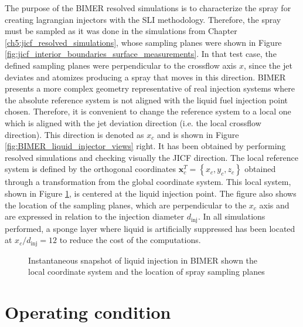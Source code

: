 The purpose of the BIMER resolved simulations is to characterize the spray for creating lagrangian injectors with the SLI methodology. Therefore, the spray must be sampled as it was done in the simulations from Chapter \ref{ch5:jicf_resolved_simulations}, whose sampling planes were shown in Figure \ref{fig:jicf_interior_boundaries_surface_measurements}. In that test case, the defined sampling planes were perpendicular to the crossflow axis $x$, since the jet deviates and atomizes producing a spray that moves in this direction. BIMER presents a more complex geometry representative of real injection systems where the absolute reference system is not aligned with the liquid fuel injection point chosen. Therefore, it is convenient to change the reference system to a local one which is aligned with the jet deviation direction (i.e. the local crossflow direction). This direction is denoted as $x_c$ and is shown in Figure \ref{fig:BIMER_liquid_injector_views} right. It has been obtained by performing resolved simulations and checking visually the JICF direction. The local reference system is defined by the orthogonal coordinates $\textbf{x}_c^T =\left\lbrace x_c, y_c, z_c \right\rbrace$ obtained through a transformation from the global coordinate system. This local system, shown in Figure \ref{fig:BIMER_local_FoR_and_sampling_planes}, is centered at the liquid injection point. The figure also shows the location of the sampling planes, which are perpendicular to the $x_c$ axis and are expressed in relation to the injection diameter $d_\mathrm{inj}$. In all simulations performed, a sponge layer where liquid is artificially suppressed has been located at $x_c/d_\mathrm{inj} = 12$ to reduce the cost of the computations.

\begin{figure}[h!]
	\centering
    \vspace*{-0.1in}
	\caption{Instantaneous snapshot of liquid injection in BIMER shown the local coordinate system and the location of spray sampling planes}	\label{fig:BIMER_local_FoR_and_sampling_planes}
\end{figure}

\vspace*{-0.2in}

\section{Operating condition}
\label{sec:ch8_BIMER_operating_condition}

